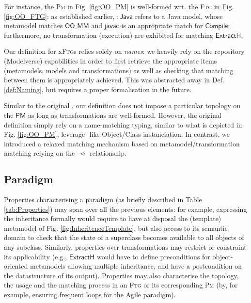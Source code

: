 For instance, the \textsc{Pm} in Fig. \ref{fig:OO_PM} is well-formed wrt. 
the \textsc{Ftg} in Fig. \ref{fig:OO_FTG}: as established earlier, 
$\mathsf{:\!Java}$ refers to a Java model, whose metamodel matches 
$\mathsf{OO\_MM}$ and $\mathsf{javac}$ is an appropriate match for 
$\mathsf{Compile}$; furthermore, no transformation (execution) are exhibited for 
matching $\mathsf{ExtractH}$.

Our definition for x\textsc{Ftg}s relies solely on \emph{names}: we heavily 
rely on the repository (Modelverse) capabilities in order to first retrieve the 
appropriate items (metamodels, models and transformations) as well as checking 
that matching between them is appropriately achieved. This was abstracted away 
in Def. \ref{def:Naming}, but requires a proper formalisation in the future.

Similar to the original  
\cite{Mustafiz-etAl:2012,Lucio-Mustafiz-etAl:2013,TR:Lucio-Mustafiz-etAl:2012},
our definition does not impose a particular topology on the $\mathsf{PM}$ as 
long as transformations are well-formed. However, the original definition 
simply rely on a name-matching typing, similar to what is depicted in Fig. 
\ref{fig:OO_PM}, leverage \UML{}-like Object/Class instanciation. In contrast, 
we introduced a relaxed matching mechanism based on metamodel/transformation 
matching relying on the $\rightsquigarrow$ relationship.

\subsection{Paradigm}
\label{sec:PS}

Properties characterising a paradigm (as briefly described in Table 
\ref{tab:Properties}) may span over all the previous elements: for example, 
expressing the inheritance formally would require to have at disposal the 
(template) metamodel of Fig. \ref{fig:InheritenceTemplate}, but also access to 
its semantic domain to check that the state of a superclass becomes available 
to all objects of any subclass. Similarly, properties over transformations may 
restrict or constraint its applicability (e.g., $\mathsf{ExtractH}$ would have 
to define preconditions for object-oriented metamodels allowing multiple 
inheritance, and have a postcondition on the datastructure of its output). 
Properties may also characterise the topology, the usage and the matching 
process in an \textsc{Ftg} or its corresponding \textsc{Pm} (by, for example, 
ensuring frequent loops for the Agile paradigm). 

